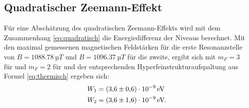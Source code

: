 \subsection{Quadratischer Zeemann-Effekt}
Für eine Abschätzung des quadratischen Zeemann-Effekts wird mit dem Zusammenhang \eqref{eq:quadratisch} die Energiedifferenz der Niveaus berechnet.
Mit den maximal gemessenen magnetischen Feldstärken für die erste Resonanzstelle von $B=\SI{1088,78}{µT}$ und $B=\SI{1096,37}{µT}$ für die zweite, ergibt sich mit $m_F=3$ für  und $m_F=2$ für  und der entsprechenden Hyperfeinstrukturaufspaltung aus Formel \eqref{eq:thermisch} ergeben sich:
\begin{align*}
  W_1&= \SI{3,6 \pm 0,6 e-9}{eV}\\
  W_2&= \SI{3,6 \pm 1,6 e-9}{eV}.
\end{align*}

